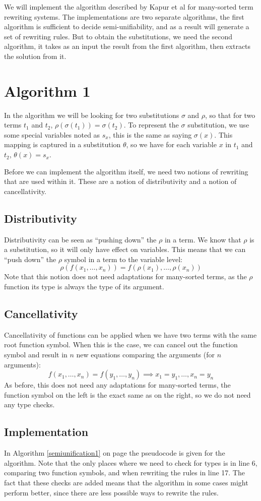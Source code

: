 We will implement the algorithm described by Kapur et al for many-sorted term rewriting systems. The implementations are two separate algorithms, the first algorithm is sufficient to decide semi-unifiability, and as a result will generate a set of rewriting rules. But to obtain the substitutions, we need the second algorithm, it takes as an input the result from the first algorithm, then extracts the solution from it.

\section{Algorithm 1}
In the algorithm we will be looking for two substitutions $\sigma$ and $\rho$, so that for two terms $t_1$ and $t_2$, $\rho(\sigma(t_1)) = \sigma(t_2)$. To represent the $\sigma$ substitution, we use some special variables noted as $s_x$, this is the same as saying $\sigma(x)$. This mapping is captured in a substitution $\theta$, so we have for each variable $x$ in $t_1$ and $t_2$, $\theta(x) = s_x$. 

Before we can implement the algorithm itself, we need two notions of rewriting that are used within it. These are a notion of distributivity and a notion of cancellativity. 
\subsection{Distributivity}
Distributivity can be seen as ``pushing down'' the $\rho$ in a term. We know that $\rho$ is a substitution, so it will only have effect on variables. This means that we can ``push down'' the $\rho$ symbol in a term to the variable level:
$$ \rho(f(x_1, \dots, x_n)) = f(\rho(x_1), \dots, \rho(x_n)) $$
Note that this notion does not need adaptations for many-sorted terms, as the $\rho$ function its type is always the type of its argument. 
\subsection{Cancellativity}
Cancellativity of functions can be applied when we have two terms with the same root function symbol. When this is the case, we can cancel out the function symbol and result in $n$ new equations comparing the arguments (for $n$ arguments):
$$ f(x_1, \dots, x_n) = f(y_1, \dots, y_n) \implies x_1 = y_1, \dots, x_n = y_n $$
As before, this does not need any adaptations for many-sorted terms, the function symbol on the left is the exact same as on the right, so we do not need any type checks. 
\subsection{Implementation}
In Algorithm \ref{semiunification1} on page \pageref{semiunification1} the pseudocode is given for the algorithm. Note that the only places where we need to check for types is in line 6, comparing two function symbols, and when rewriting the rules in line 17. The fact that these checks are added means that the algorithm in some cases might perform better, since there are less possible ways to rewrite the rules.

